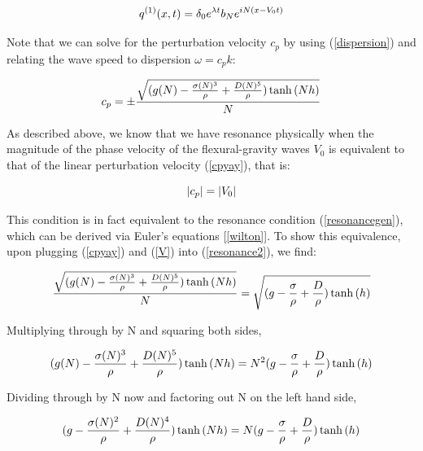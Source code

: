 \documentclass{article}
\begin{document}
\begin{equation} \label{q2}
  q^{(1)}(x,t) = \delta_{0}e^{\lambda t}b_{N}e^{iN(x-V_{0}t)}
\\
\end{equation} 

Note that we can solve for the perturbation velocity \(c_p\) by using (\ref{dispersion}) and relating the wave speed to dispersion \(\omega = c_p k\):

\begin{equation} \label{cpyay}
  c_{p} = \pm \frac{\sqrt{(g(N) - \frac{\sigma(N)^3}{\rho} + \frac{D(N)^5}{\rho})\tanh{(Nh)}}}{N}
\\
\end{equation} 

As described above, we know that we have resonance physically when the magnitude of the phase velocity of the flexural-gravity waves \(V_{0}\) is equivalent to that of the linear perturbation velocity (\ref{cpyay}), that is:

\begin{equation} \label{resonance2}
  |c_{p}| = |V_0| \\
\end{equation} 

This condition is in fact equivalent to the resonance condition (\ref{resonancegen}), which can be derived via Euler's equations [\ref{wilton}]. To show this equivalence, upon plugging (\ref{cpyay}) and (\ref{V}) into (\ref{resonance2}), we find: 

\begin{equation} 
  \frac{\sqrt{(g(N) - \frac{\sigma(N)^3}{\rho} + \frac{D(N)^5}{\rho})\tanh{(Nh)}}}{N} = \sqrt{(g - \frac{\sigma }{\rho} + \frac{D }{\rho})\tanh{(h)}}   \\
\end{equation} 

Multiplying through by N and squaring both sides,

\begin{equation} 
  (g(N) - \frac{\sigma(N)^3}{\rho} + \frac{D(N)^5}{\rho})\tanh{(Nh)} = N^2(g - \frac{\sigma }{\rho} + \frac{D }{\rho})\tanh{(h)}   \\
\end{equation} 

Dividing through by N now and factoring out N on the left hand side,

\begin{equation} 
  (g - \frac{\sigma(N)^2}{\rho} + \frac{D(N)^4}{\rho})\tanh{(Nh)} = N(g - \frac{\sigma }{\rho} + \frac{D }{\rho})\tanh{(h)}   \\
\end{equation} 
\end{document}

